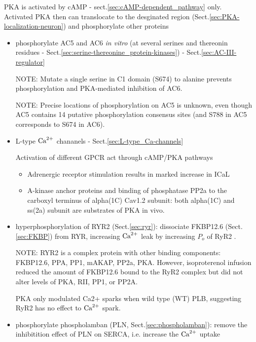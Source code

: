 PKA is activated by cAMP - sect.\ref{sec:cAMP-dependent_pathway} only. Activated
PKA then can translocate to the desginated region
(Sect.\ref{sec:PKA-localization-neuron}) and phosphorylate other proteins
\begin{itemize}

  \item phosphorylate AC5 and AC6 {\it in vitro} (at several serines and
  thereonin residues - Sect.\ref{sec:serine-thereonine_protein-kinases}) -
  Sect.\ref{sec:AC-III-regulator}

NOTE: Mutate a single serine in C1 domain (S674) to alanine prevents
phosphorylation and PKA-mediated inhibition of AC6.

NOTE: Precise locations of phosphorylation on AC5 is unknown, even though AC5
contains 14 putative phosphorylation consensus sites (and S788 in AC5
corresponds to S674 in AC6).

  \item L-type ${\text{Ca}^{2+}}$ chananels \citep{Kamp2000} - Sect.\ref{sec:L-type_Ca-channels}

Activation of different GPCR act through cAMP/PKA pathways

\begin{itemize}
  \item Adrenergic receptor stimulation results in marked increase in ICaL
  \item A-kinase anchor proteins and binding of phosphatase PP2a to the carboxyl
  terminus of alpha(1C) Cav1.2 subunit: both alpha(1C) and ss(2a) subunit are
  substrates of PKA in vivo.
\end{itemize}


  \item  hyperphosphorylation of RYR2 (Sect.\ref{sec:ryr}):
  dissociate FKBP12.6 (Sect.\ref{sec:FKBP}) from RYR, increasing ${\text{Ca}^{2+}}$ leak by
  increasing $P_o$ of RyR2 \citep{marx2000}.


NOTE: RYR2 is a complex protein with other binding components: FKBP12.6, PPA,
PP1, mAKAP, PP2a, PKA. However, isoproterenol infusion reduced the amount of
FKBP12.6 bound to the RyR2 complex but did not alter levels of PKA, RII, PP1, or
PP2A.

PKA only modulated Ca2+ sparks when wild type (WT) PLB,  suggesting RyR2 has no
effect to ${\text{Ca}^{2+}}$ spark.

  \item phosphorylate phospholamban (PLN, Sect.\ref{sec:phospholamban}): remove
  the inhibitition effect of PLN on SERCA, i.e. increase the ${\text{Ca}^{2+}}$ uptake


\end{itemize}
